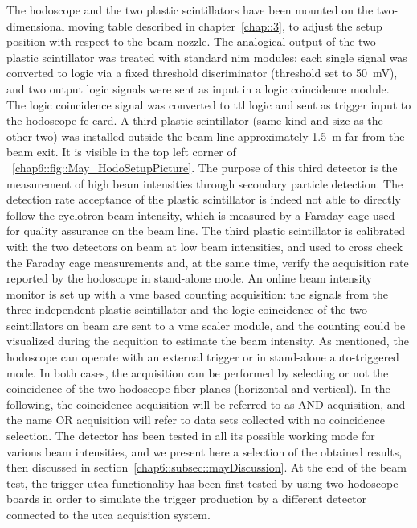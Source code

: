 The hodoscope and the two plastic scintillators have been mounted on the two-dimensional moving table described in chapter~\ref{chap::3}, to adjust the setup position with respect to the beam nozzle. 
The analogical output of the two plastic scintillator was treated with standard \gls{nim} modules: each single signal was converted to logic via a fixed threshold discriminator (threshold set to 50~mV), and two output logic signals were sent as input in a logic coincidence module. The logic coincidence signal was converted to \gls{ttl} logic and sent as trigger input to the hodoscope \gls{fe} card. 
A third plastic scintillator (same kind and size as the other two) was installed outside the beam line approximately 1.5~m far from the beam exit. It is visible in the top left corner of \figurename~\ref{chap6::fig::May_HodoSetupPicture}. The purpose of this third detector is the measurement of high beam intensities through secondary particle detection. The detection rate acceptance of the plastic scintillator is indeed not able to directly follow the cyclotron beam intensity, which is measured by a Faraday cage used for quality assurance on the beam line. The third plastic scintillator is calibrated with the two detectors on beam at low beam intensities, and used to cross check the Faraday cage measurements and, at the same time, verify the acquisition rate reported by the hodoscope in stand-alone mode. 
An online beam intensity monitor is set up with a \gls{vme} based counting acquisition: the signals from the three independent plastic scintillator and the logic coincidence of the two scintillators on beam are sent to a \gls{vme} scaler module, and the counting could be visualized during the acquition to estimate the beam intensity.
As mentioned, the hodoscope can operate with an external trigger or in stand-alone auto-triggered mode. In both cases, the acquisition can be performed by selecting or not the coincidence of the two hodoscope fiber planes (horizontal and vertical). In the following, the coincidence acquisition will be referred to as AND acquisition, and the name OR acquisition will refer to data sets collected with no coincidence selection.  
The detector has been tested in all its possible working mode for various beam intensities, and we present here a selection of the obtained results, then discussed in section~\ref{chap6::subsec::mayDiscussion}.
At the end of the beam test, the trigger \gls{utca} functionality has been first tested by using two hodoscope boards in order to simulate the trigger production by a different detector connected to the \gls{utca} acquisition system.


